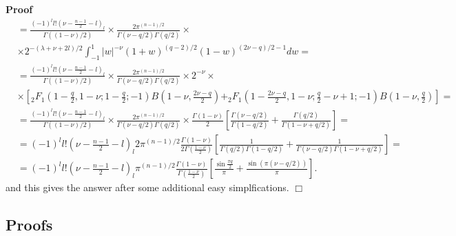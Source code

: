 \documentclass{article}
\newenvironment{proof}{\noindent\textbf{Proof\ }}{\hspace*{\fill}$\Box$\medskip}
\begin{document}
\begin{proof}
\begin{eqnarray}
    & = \frac{(- 1)^l l! \left( \nu - \frac{n - 1}{2} - l \right)_l}{\Gamma
    ((1 - \nu) / 2)} \times \frac{2 \pi^{(n - 1) / 2}}{\Gamma (\nu - q / 2)
    \Gamma (q / 2)} \times &  \nonumber\\
    & \times 2^{- (\lambda + \nu + 2 l) / 2} \int_{- 1}^1 | w |^{- \nu} (1 +
    w)^{(q - 2) / 2} (1 - w)^{(2 \nu - q) / 2 - 1} d w = &  \nonumber\\
    & = \frac{(- 1)^l l! \left( \nu - \frac{n - 1}{2} - l \right)_l}{\Gamma
    ((1 - \nu) / 2)} \times \frac{2 \pi^{(n - 1) / 2}}{\Gamma (\nu - q / 2)
    \Gamma (q / 2)} \times 2^{- \nu} \times &  \nonumber\\
    & \times \left[ _2 F_1 \left( 1 - \frac{q}{2}, 1 - \nu ; 1 -
    \frac{q}{2} ; - 1 \right) B \left( 1 - \nu, \frac{2 \nu - q}{2} \right)
    +_2 F_1 \left( 1 - \frac{2 \nu - q}{2}, 1 - \nu ; \frac{q}{2} - \nu + 1 ;
    - 1 \right) B \left( 1 - \nu, \frac{q}{2} \right) \right] = &  \nonumber\\
    & = \frac{(- 1)^l l! \left( \nu - \frac{n - 1}{2} - l \right)_l}{\Gamma
    ((1 - \nu) / 2)} \times \frac{2 \pi^{(n - 1) / 2}}{\Gamma (\nu - q / 2)
    \Gamma (q / 2)} \times \frac{\Gamma (1 - \nu)}{2} \left[ \frac{\Gamma (\nu
    - q / 2)}{\Gamma (1 - q / 2)} + \frac{\Gamma (q / 2)}{\Gamma (1 - \nu + q
    / 2)} \right] = &  \nonumber\\
    & = (- 1)^l l! \left( \nu - \frac{n - 1}{2} - l \right)_l 2 \pi^{(n - 1)
    / 2} \frac{\Gamma (1 - \nu)}{2 \Gamma \left( \frac{1 - \nu}{2} \right)}
    \left[ \frac{1}{\Gamma (q / 2) \Gamma (1 - q / 2)} + \frac{1}{\Gamma (\nu
    - q / 2) \Gamma (1 - \nu + q / 2)} \right] = &  \nonumber\\
    & = (- 1)^l l! \left( \nu - \frac{n - 1}{2} - l \right)_l \pi^{(n - 1) /
    2} \frac{\Gamma (1 - \nu)}{\Gamma \left( \frac{1 - \nu}{2} \right)} \left[
    \frac{\sin \frac{\pi q}{2}}{\pi} + \frac{\sin (\pi (\nu - q / 2))}{\pi}
    \right] . &  \nonumber
  \end{eqnarray}
  and this gives the answer after some additional easy simplfications.
\end{proof}

\subsection{Proofs}
\end{document}
